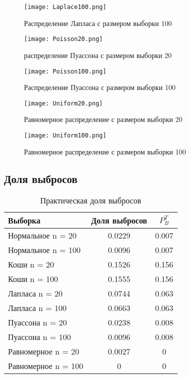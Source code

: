 \documentclass[12pt,a4paper]{article}
\begin{document}
\begin{figure}[H]
    \centering
    \texttt{[image: Laplace100.png]}
    \caption{Распределение Лапласа с размером выборки 100}
    \label{fig:normal}
\end{figure}

\begin{figure}[H]
    \centering
    \texttt{[image: Poisson20.png]}
    \caption{распределение Пуассона с размером выборки 20}
    \label{fig:normal}
\end{figure}

\begin{figure}[H]
    \centering
    \texttt{[image: Poisson100.png]}
    \caption{Распределение Пуассона с размером выборки 100}
    \label{fig:normal}
\end{figure}

\begin{figure}[H]
    \centering
    \texttt{[image: Uniform20.png]}
    \caption{Равномерное распределение с размером выборки 20}
    \label{fig:normal}
\end{figure}

\begin{figure}[H]
    \centering
    \texttt{[image: Uniform100.png]}
    \caption{Равномерное распределение с размером выборки 100}
    \label{fig:normal}
\end{figure}

\subsection{Доля выбросов}
\begin{table}[H]
	\centering
	\begin{tabular}{|l|c|c|}
		\hline
		Выборка & Доля выбросов	& $P^T_B$\\\hline
		\hline
		Нормальное n = 20 & 0.0229 & 0.007\\\hline
		Нормальное n = 100 & 0.0096 & 0.007\\\hline
		Коши n = 20 & 0.1526 & 0.156\\\hline
		Коши n = 100 & 0.1555 & 0.156\\\hline
		Лапласа n = 20 & 0.0744 & 0.063\\\hline
		Лапласа n = 100 & 0.0663 & 0.063\\\hline
		Пуассона n = 20 & 0.0238 & 0.008\\\hline
		Пуассона n = 100 & 0.0096 & 0.008\\\hline
		Равномерное n = 20 & 0.0027 & 0\\\hline
		Равномерное n = 100 & 0 & 0\\\hline
	\end{tabular}
	\caption{Практическая доля выбросов}
\end{table}
\end{document}
